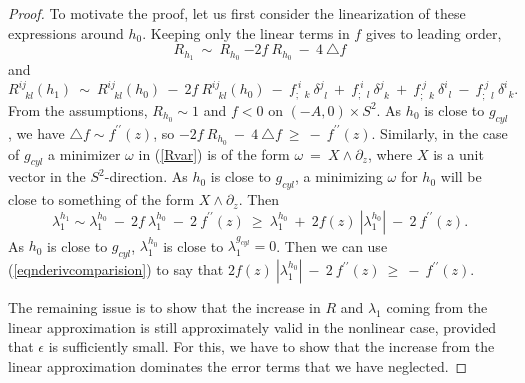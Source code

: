 \documentclass[12pt]{amsart}
\numberwithin{equation}{section}
\theoremstyle{plain}
\theoremstyle{definition}
\theoremstyle{remark}
\begin{document}
\begin{proof}
To motivate the proof, let us first consider the linearization of these expressions around
$h_0$. Keeping only the linear terms in $f$ gives 
to leading order,
\begin{equation}
R_{h_1} \: \sim \: R_{h_0} \:  {-2f} \:  R_{h_0} \:  - \: 4 \: \triangle f
\end{equation}
and
\begin{equation}
R^{ij}_{\: \: \: kl}(h_1) \:  \sim \: R^{ij}_{\: \: \: kl}(h_0) \: - \: {2f} \:  R^{ij}_{\: \: \: kl}(h_0) 
\: - \: {f}^{ \: i}_{; \: \: k} \:  \delta^j_{\: \: l}
\: + \: {f}^{ \: i}_{; \: \: l} \:  \delta^j_{\: \: k}
\: + \: {f}^{ \: j}_{; \: \: k} \:  \delta^i_{\: \: l}
\: - \: {f}^{ \: j}_{; \: \: l} \:  \delta^i_{\: \: k}.
\end{equation}
From the assumptions, $R_{h_0} \sim 1$ and $f < 0$ on $(-A,0) \times S^2$.
As $h_0$ is close to $g_{cyl}$, we have $\triangle f \sim f^{\prime \prime}(z)$,
so ${-2f} \:  R_{h_0} \:  - \: 4 \: \triangle f \: \ge \: - \: f^{\prime \prime}(z)$.
Similarly, in the case of $g_{cyl}$ a minimizer
$\omega$ in (\ref{Rvar}) is of the  form $\omega \: = \: X \wedge \partial_z$,
where $X$ is a unit vector in the $S^2$-direction.  As $h_0$ is close to
$g_{cyl}$, a minimizing $\omega$ for $h_0$ will be close to something of
the form $X \wedge \partial_z$. Then
\begin{equation}
\lambda_1^{h_1} \sim \lambda_1^{h_0} \: - \: 2f \: \lambda_1^{h_0}\: - \: 2 \:
f^{\prime \prime}(z) \: \ge \: \lambda_1^{h_0} \: + \: 2 f(z) \: |\lambda_1^{h_0}|\: - \: 2 \:
f^{\prime \prime}(z).
\end{equation}
As $h_0$ is close to $g_{cyl}$, $\lambda_1^{h_0}$ is close to
$\lambda_1^{g_{cyl}} = 0$. Then we can
use (\ref{eqnderivcomparision}) to say that $2 f(z) \: |\lambda_1^{h_0}|\: - \: 2 \:
f^{\prime \prime}(z) \: \ge \: - \: f^{\prime \prime}(z)$.

The remaining issue is to show that the increase in $R$ and $\lambda_1$
coming from the linear approximation is still approximately valid in the
nonlinear case, provided that $\epsilon$ is sufficiently small. For this,
we have to show that the increase from the linear approximation dominates
the error terms that we have neglected.


\end{proof}
\end{document}
